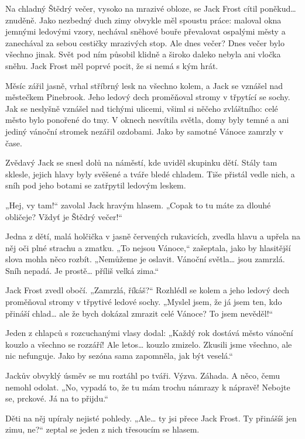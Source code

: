 \documentclass{article}
\begin{document}

Na chladný Štědrý večer, vysoko na mrazivé obloze, se Jack Frost cítil poněkud… znuděně. Jako nezbedný duch zimy obvykle měl spoustu práce: maloval okna jemnými ledovými vzory, nechával sněhové bouře převalovat ospalými městy a zanechával za sebou cestičky mrazivých stop. Ale dnes večer? Dnes večer bylo všechno jinak. Svět pod ním působil klidně a široko daleko nebyla ani vločka sněhu. Jack Frost měl poprvé pocit, že si nemá s kým hrát.

Měsíc zářil jasně, vrhal stříbrný lesk na všechno kolem, a Jack se vznášel nad městečkem Pinebrook. Jeho ledový dech proměňoval stromy v třpytící se sochy. Jak se neslyšně vznášel nad tichými ulicemi, všiml si něčeho zvláštního: celé město bylo ponořené do tmy. V oknech nesvítila světla, domy byly temné a ani jediný vánoční stromek nezářil ozdobami. Jako by samotné Vánoce zamrzly v čase.

Zvědavý Jack se snesl dolů na náměstí, kde uviděl skupinku dětí. Stály tam sklesle, jejich hlavy byly svěšené a tváře bledé chladem. Tiše přistál vedle nich, a sníh pod jeho botami se zatřpytil ledovým leskem.

„Hej, vy tam!“ zavolal Jack hravým hlasem. „Copak to tu máte za dlouhé obličeje? Vždyť je Štědrý večer!“

Jedna z dětí, malá holčička v jasně červených rukavicích, zvedla hlavu a upřela na něj oči plné strachu a zmatku. „To nejsou Vánoce,“ zašeptala, jako by hlasitější slova mohla něco rozbít. „Nemůžeme je oslavit. Vánoční světla… jsou zamrzlá. Sníh nepadá. Je prostě… příliš velká zima.“

Jack Frost zvedl obočí. „Zamrzlá, říkáš?“ Rozhlédl se kolem a jeho ledový dech proměňoval stromy v třpytivé ledové sochy. „Myslel jsem, že já jsem ten, kdo přináší chlad… ale že bych dokázal zmrazit celé Vánoce? To jsem nevěděl!“

Jeden z chlapců s rozcuchanými vlasy dodal: „Každý rok dostává město vánoční kouzlo a všechno se rozzáří! Ale letos… kouzlo zmizelo. Zkusili jsme všechno, ale nic nefunguje. Jako by sezóna sama zapomněla, jak být veselá.“

Jackův obvyklý úsměv se mu roztáhl po tváři. Výzva. Záhada. A něco, čemu nemohl odolat. „No, vypadá to, že tu mám trochu námrazy k nápravě! Nebojte se, prckové. Já na to přijdu.“

Děti na něj upíraly nejisté pohledy. „Ale… ty jsi přece Jack Frost. Ty přinášíš jen zimu, ne?“ zeptal se jeden z nich třesoucím se hlasem.
\end{document}

